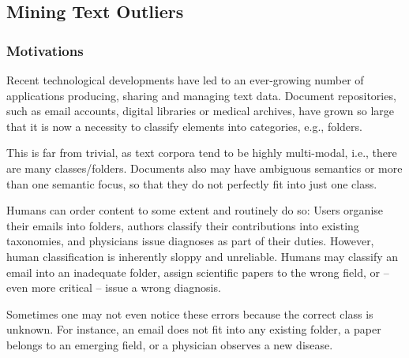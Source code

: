 \subsection{Mining Text Outliers}
\label{sec:textoutlierprelim}

\subsubsection{Motivations}

Recent technological developments have led to an ever-growing number of applications producing, sharing and managing text data. Document repositories, such as email accounts, digital libraries or medical archives, have grown so large that it is now a necessity to classify elements into categories, e.g., folders. 

This is far from trivial, as text corpora tend to be highly multi-modal, i.e., there are many classes/folders. 
Documents also may have ambiguous semantics or more than one semantic focus, so that they do not perfectly fit into just one class.

Humans can order content to some extent and routinely do so: Users organise their emails into folders, authors classify their contributions into existing taxonomies, and physicians issue diagnoses as part of their duties. 
However, human classification is inherently sloppy and unreliable. %
Humans may classify an email into an inadequate folder, assign scientific papers to the wrong field, or -- even more critical -- issue a wrong diagnosis. 

Sometimes one may not even notice these errors because the correct class is unknown. 
For instance, an email does not fit into any existing folder, a paper belongs to an emerging field, or a physician observes a new disease.  %

